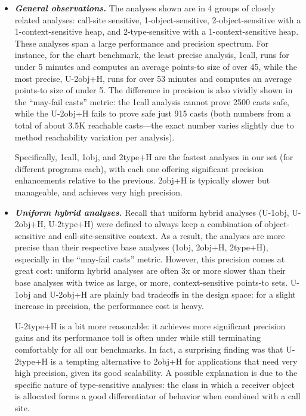 \begin{itemize}
\item \textbf{\emph{General observations.}}
The analyses shown are in 4 groups of closely related analyses: call-site sensitive, 1-object-sensitive, 2-object-sensitive with a 1-context-sensitive heap, and 2-type-sensitive with a 1-context-sensitive heap. These analyses span a large performance and precision spectrum. For instance, for the chart benchmark, the least precise analysis, 1call, runs for under 5 minutes and computes an average points-to size of over 45, while the most precise, U-2obj+H, runs for over 53 minutes and computes an average points-to size of under 5. The difference in precision is also vividly shown in the ``may-fail casts'' metric: the 1call analysis cannot prove 2500 casts safe, while the U-2obj+H fails to prove safe just 915 casts (both numbers from a total of about 3.5K reachable casts---the exact number varies slightly due to method reachability variation per analysis). 

Specifically, 1call, 1obj, and 2type+H are the fastest analyses in our set (for different programs each), with each one offering significant precision enhancements relative to the previous. 2obj+H is typically slower but manageable, and achieves very high precision.

\item \textbf{\emph{Uniform hybrid analyses.}}
Recall that uniform hybrid analyses (U-1obj, U-2obj+H, U-2type+H) were defined to always keep a combination of object-sensitive and call-site-sensitive context. As a result, the analyses are more precise than their respective base analyses (1obj, 2obj+H, 2type+H), especially in the ``may-fail casts'' metric. However, this precision comes at great cost: uniform hybrid analyses are often 3x or more slower than their base analyses with twice as large, or more, context-sensitive points-to sets. U-1obj and U-2obj+H are plainly bad tradeoffs in the design space: for a slight increase in precision, the performance cost is heavy.

U-2type+H is a bit more reasonable: it achieves more significant precision gains and its performance toll is often under  while still terminating comfortably for all our benchmarks. In fact, a surprising finding was that U-2type+H is a tempting alternative to 2obj+H for applications that need very high precision, given its good scalability. A possible explanation is due to the specific nature of type-sensitive analyses: the class in which a receiver object is allocated forms a good differentiator of behavior when combined with a call site.


\end{itemize}
